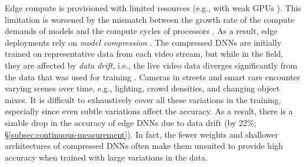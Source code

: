 Edge compute is provisioned with limited resources (e.g., with weak GPUs \cite{aws-outposts, azure-ase}). This limitation is worsened by the mismatch between the growth rate of the compute demands of models and the compute cycles of processors \cite{ion-blog, openai-blog}. As a result, edge deployments rely on {\em model compression} \cite{compression-4, compression-5, compression-6}. %
The compressed DNNs are initially trained on representative data from each video stream, but while in the field, they are affected by {\em data drift}, i.e., the live video data diverges significantly from the data that was used for training \cite{datadrift-7, datadrift-8, datadrift-a, datadrift-b}. Cameras in streets and smart cars encounter  %
varying scenes over time, e.g., lighting, crowd densities, %
and changing object mixes. %
It is difficult to exhaustively cover all these variations in the training, especially since even subtle variations affect the accuracy. As a result, there is a sizable drop in the accuracy of edge DNNs due to data drift (by 22\%; \S\ref{subsec:continuous-measurement}). %
In fact, %
the fewer weights and shallower architectures of compressed DNNs often make them unsuited to provide high accuracy when trained with large variations in the data.%

